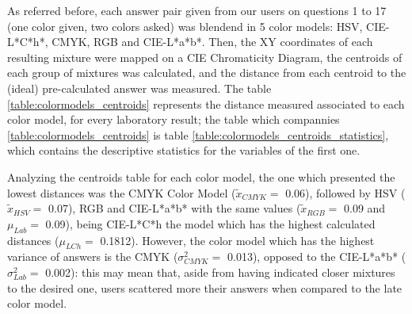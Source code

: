 %
As referred before, each answer pair given from our users on questions 1 to 17 (one color given, two colors asked) was blendend in 5 color models: HSV, CIE-L*C*h*, CMYK, RGB and CIE-L*a*b*. Then, the XY coordinates of each resulting
mixture were mapped on a CIE Chromaticity Diagram, the centroids of each group of mixtures was calculated, and the distance from each centroid to the (ideal) pre-calculated answer was measured. The table \ref{table:colormodels_centroids}
represents the distance measured associated to each color model, for every laboratory result; the table which compannies \ref{table:colormodels_centroids} is table \ref{table:colormodels_centroids_statistics}, which
contains the descriptive statistics for the variables of the first one. \par
%
Analyzing the centroids table for each color model, the one which presented the lowest distances was the CMYK Color Model ($\tilde{x}_{CMYK} = $ 0.06), followed by HSV ($\tilde{x}_{HSV} = $ 0.07), RGB and CIE-L*a*b* with the
same values ($\tilde{x}_{RGB} = $ 0.09 and $\mu_{Lab} = $ 0.09), being CIE-L*C*h the model which has the highest calculated distances ($\mu_{LCh} = $ 0.1812). However, the color model which has the highest variance of answers is the
CMYK ($\sigma^2_{CMYK} = $ 0.013), opposed to the CIE-L*a*b* ($\sigma^2_{Lab} = $ 0.002): this may mean that, aside from having indicated closer mixtures to the desired one, users scattered more their answers when compared to the late color model. \par
%
